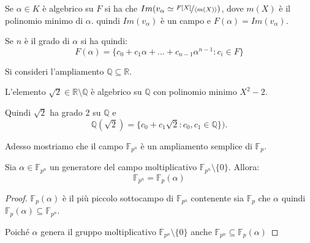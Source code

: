 \documentclass[../main.tex]{subfiles}
\begin{document}
Se $\alpha \in K$ è algebrico su $F$ si ha che $Im(v_\alpha \simeq \nicefrac{F[X]}{\langle m(X)\rangle})$, dove $m(X)$ è il polinomio minimo di $\alpha$. quindi $Im(v_\alpha)$ è un campo e $F(\alpha) = Im(v_\alpha)$.

Se $n$ è il grado di $\alpha$ si ha quindi:
\begin{equation*}
    F(\alpha) = \{c_0 + c_1\alpha + \ldots + c_{n-1}\alpha^{n-1} : c_i \in F\}
\end{equation*}

\begin{example}
    Si consideri l'ampliamento $\mathbb{Q} \subseteq \mathbb{R}$.

    L'elemento $\sqrt{2}\in \mathbb{R} \setminus \mathbb{Q}$ è algebrico su $\mathbb{Q}$ con polinomio minimo $X^2 -2$.

    Quindi $\sqrt{2}$ ha grado 2 su $\mathbb{Q}$ e
    \begin{equation*}
        \mathbb{Q}(\sqrt{2}) = \{ c_0 + c_1 \sqrt{2} : c_0,c_1 \in \mathbb{Q}\}).
    \end{equation*}
\end{example}

Adesso mostriamo che il campo $\mathbb{F}_{p^n}$ è un ampliamento semplice di $\mathbb{F}_p$.
\begin{proposition}
    Sia $\alpha \in \mathbb{F}_{p^n}$ un generatore del campo moltiplicativo $\mathbb{F}_{p^n} \setminus \{0\}$. Allora:
    \begin{equation*}
        \mathbb{F}_{p^n} = \mathbb{F}_p(\alpha)
    \end{equation*}
\end{proposition}

\begin{proof}
    $\mathbb{F}_p(\alpha)$ è il più piccolo sottocampo di $\mathbb{F}_{p^n}$ contenente sia $\mathbb{F}_p$ che $\alpha$ quindi $\mathbb{F}_p(\alpha) \subseteq \mathbb{F}_{p^n}$.

    Poiché $\alpha$ genera il gruppo moltiplicativo $\mathbb{F}_{p^n} \setminus \{0\}$ anche $\mathbb{F}_{p^n} \subseteq \mathbb{F}_p(\alpha)$
\end{proof}
\end{document}
